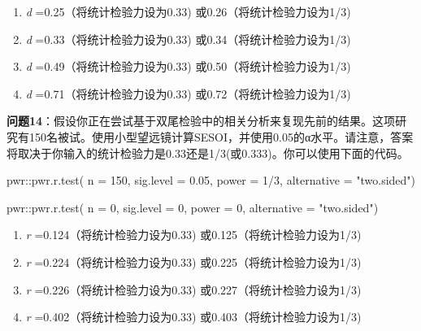 \documentclass[
  letterpaper,
  DIV=11,
  numbers=noendperiod]{scrreprt}
\newenvironment{Shaded}{\begin{snugshade}}{\end{snugshade}}
\newcommand{\AttributeTok}[1]{\textcolor[rgb]{0.40,0.45,0.13}{#1}}
\newcommand{\DecValTok}[1]{\textcolor[rgb]{0.68,0.00,0.00}{#1}}
\newcommand{\FloatTok}[1]{\textcolor[rgb]{0.68,0.00,0.00}{#1}}
\newcommand{\FunctionTok}[1]{\textcolor[rgb]{0.28,0.35,0.67}{#1}}
\newcommand{\NormalTok}[1]{\textcolor[rgb]{0.00,0.23,0.31}{#1}}
\newcommand{\SpecialCharTok}[1]{\textcolor[rgb]{0.37,0.37,0.37}{#1}}
\newcommand{\StringTok}[1]{\textcolor[rgb]{0.13,0.47,0.30}{#1}}
\providecommand{\tightlist}{%
  \setlength{\itemsep}{0pt}\setlength{\parskip}{0pt}}\usepackage{longtable,booktabs,array}
\begin{document}
\begin{enumerate}
\def\labelenumi{\Alph{enumi})}
\tightlist
\item
  \emph{d} =0.25（将统计检验力设为0.33) 或0.26（将统计检验力设为1/3)
\item
  \emph{d} =0.33（将统计检验力设为0.33) 或0.34（将统计检验力设为1/3)
\item
  \emph{d} =0.49（将统计检验力设为0.33) 或0.50（将统计检验力设为1/3)
\item
  \emph{d} =0.71（将统计检验力设为0.33) 或0.72（将统计检验力设为1/3)
\end{enumerate}

\textbf{问题14}：假设你正在尝试基于双尾检验中的相关分析来复现先前的结果。这项研究有150名被试。使用小型望远镜计算SESOI，并使用0.05的α水平。请注意，答案将取决于你输入的统计检验力是0.33还是1/3(或0.333)。你可以使用下面的代码。

\begin{Shaded}
\begin{Highlighting}[]
\NormalTok{pwr}\SpecialCharTok{::}\FunctionTok{pwr.r.test}\NormalTok{(}
  \AttributeTok{n =} \DecValTok{150}\NormalTok{,}
  \AttributeTok{sig.level =} \FloatTok{0.05}\NormalTok{,}
  \AttributeTok{power =} \DecValTok{1}\SpecialCharTok{/}\DecValTok{3}\NormalTok{,}
  \AttributeTok{alternative =} \StringTok{"two.sided"}\NormalTok{)}
\end{Highlighting}
\end{Shaded}

\begin{Shaded}
\begin{Highlighting}[]
\NormalTok{pwr}\SpecialCharTok{::}\FunctionTok{pwr.r.test}\NormalTok{(}
  \AttributeTok{n =} \DecValTok{0}\NormalTok{, }
  \AttributeTok{sig.level =} \DecValTok{0}\NormalTok{, }
  \AttributeTok{power =} \DecValTok{0}\NormalTok{, }
  \AttributeTok{alternative =} \StringTok{"two.sided"}\NormalTok{)}
\end{Highlighting}
\end{Shaded}

\begin{enumerate}
\def\labelenumi{\Alph{enumi})}
\tightlist
\item
  \emph{r} =0.124（将统计检验力设为0.33) 或0.125（将统计检验力设为1/3)
\item
  \emph{r} =0.224（将统计检验力设为0.33) 或0.225（将统计检验力设为1/3)
\item
  \emph{r} =0.226（将统计检验力设为0.33) 或0.227（将统计检验力设为1/3)
\item
  \emph{r} =0.402（将统计检验力设为0.33) 或0.403（将统计检验力设为1/3)
\end{enumerate}
\end{document}
